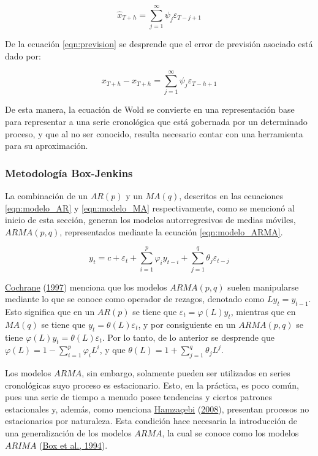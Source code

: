 \documentclass[
]{article}
\begin{document}
\begin{equation}
\label{eqn:prevision}
\hat x_{T+h}=\sum_{j=1}^{\infty} \psi_j \varepsilon_{T-j+1}
\end{equation}

De la ecuación \ref{eqn:prevision} se desprende que el error de
previsión asociado está dado por:

\begin{equation}
\label{eqn:error_prevision}
x_{T+h}- \hat x_{T+h}=\sum_{j=1}^{\infty} \psi_j \varepsilon_{T-h+1}
\end{equation}

De esta manera, la ecuación de Wold se convierte en una representación
base para representar a una serie cronológica que está gobernada por un
determinado proceso, y que al no ser conocido, resulta necesario contar
con una herramienta para su aproximación.

\subsubsection{Metodología Box-Jenkins}

La combinación de un \(AR(p)\) y un \(MA(q)\), descritos en las
ecuaciones \ref{eqn:modelo_AR} y \ref{eqn:modelo_MA} respectivamente,
como se mencionó al inicio de esta sección, generan los modelos
autorregresivos de medias móviles, \(ARMA(p,q)\), representados mediante
la ecuación \ref{eqn:modelo_ARMA}.

\begin{equation}
\label{eqn:modelo_ARMA}
y_t=c+\varepsilon_t+\sum_{i=1}^p \varphi_iy_{t-i}+\sum_{j=1}^q \theta_j \varepsilon_{t-j}
\end{equation}

\protect\hyperlink{ref-Cochrane}{Cochrane}
(\protect\hyperlink{ref-Cochrane}{1997}) menciona que los modelos
\(ARMA(p,q)\) suelen manipularse mediante lo que se conoce como operador
de rezagos, denotado como \(Ly_t=y_{t-1}\). Esto significa que en un
\(AR(p)\) se tiene que \(\varepsilon_t=\varphi(L)y_t\), mientras que en
\(MA(q)\) se tiene que \(y_t=\theta(L)\varepsilon_t\), y por
consiguiente en un \(ARMA(p,q)\) se tiene
\(\varphi(L)y_t=\theta(L)\varepsilon_t\). Por lo tanto, de lo anterior
se desprende que \(\varphi(L)=1-\sum_{i=1}^p \varphi_iL^i\), y que
\(\theta(L)=1+\sum_{j=1}^q\theta_jL^j\).

Los modelos \(ARMA\), sin embargo, solamente pueden ser utilizados en
series cronológicas suyo proceso es estacionario. Esto, en la práctica,
es poco común, pues una serie de tiempo a menudo posee tendencias y
ciertos patrones estacionales y, además, como menciona
\protect\hyperlink{ref-Hamzacebi}{Hamzaçebi}
(\protect\hyperlink{ref-Hamzacebi}{2008}), presentan procesos no
estacionarios por naturaleza. Esta condición hace necesaria la
introducción de una generalización de los modelos \(ARMA\), la cual se
conoce como los modelos \(ARIMA\)
(\protect\hyperlink{ref-box-jenkins}{Box et al., 1994}).
\end{document}

